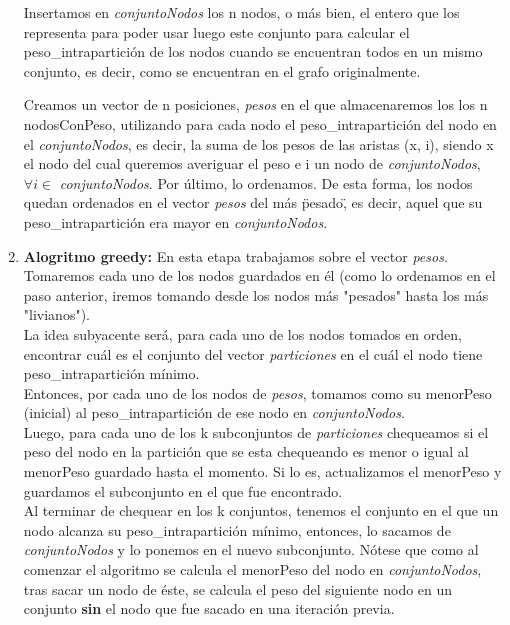 \documentclass[10pt,a4paper]{article}
\begin{document}
\begin{enumerate}
Insertamos en \textit{conjuntoNodos} los n nodos, o más bien, el entero que los representa para poder usar luego este conjunto para calcular el peso\_intrapartición de los nodos cuando se encuentran todos en un mismo conjunto, es decir, como se encuentran en el grafo originalmente.

Creamos un vector de n posiciones, \textit{pesos} en el que almacenaremos los  los n nodosConPeso, utilizando para cada nodo el peso\_intrapartición del nodo en el \textit{conjuntoNodos}, es decir, la suma de los pesos de las aristas (x, i), siendo x el nodo del cual queremos averiguar el peso e i un nodo de \textit{conjuntoNodos}, $\forall i \in$ \textit{conjuntoNodos}. Por último, lo ordenamos. De esta forma, los nodos quedan ordenados en el vector \textit{pesos} del más \"pesado\", es decir, aquel que su peso\_intrapartición era mayor en \textit{conjuntoNodos}.\\

\item \textbf{Alogritmo greedy:}
En esta etapa trabajamos sobre el vector \textit{pesos}. Tomaremos cada uno de los nodos guardados en él (como lo ordenamos en el paso anterior, iremos tomando desde los nodos más "pesados" hasta los más "livianos").\\
La idea subyacente será, para cada uno de los nodos tomados en orden, encontrar cuál es el conjunto del vector \textit{particiones} en el cuál el nodo tiene peso\_intrapartición mínimo.\\
Entonces, por cada uno de los nodos de \textit{pesos}, tomamos como su menorPeso (inicial) al peso\_intrapartición de ese nodo en \textit{conjuntoNodos}.\\
Luego, para cada uno de los k subconjuntos de \textit{particiones} chequeamos si el peso del nodo en la partición que se esta chequeando es menor o igual al menorPeso guardado hasta el momento. Si lo es, actualizamos el menorPeso y guardamos el subconjunto en el que fue encontrado.\\
Al terminar de chequear en los k conjuntos, tenemos el conjunto en el que un nodo alcanza su peso\_intrapartición mínimo, entonces, lo sacamos de \textit{conjuntoNodos} y lo ponemos en el nuevo subconjunto. Nótese que como al comenzar el algoritmo se calcula el menorPeso del nodo en  \textit{conjuntoNodos}, tras sacar un nodo de éste, se calcula el peso del siguiente nodo en un conjunto \textbf{sin} el nodo que fue sacado en una iteración previa.\\
\end{enumerate}
\end{document}
